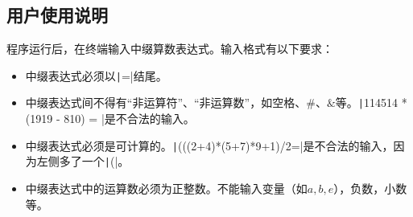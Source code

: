 \documentclass[10pt,a4paper]{article}
\begin{document}
	\subsection{用户使用说明}
	\noindent 程序运行后，在终端输入中缀算数表达式。输入格式有以下要求：
	\begin{itemize}
		\item 中缀表达式必须以\texttt|=|结尾。
		\item 中缀表达式间不得有“非运算符”、“非运算数”，如空格、$\#$、$\&$等。\texttt|114514 * (1919 - 810) = |是不合法的输入。
		\item 中缀表达式必须是可计算的。\texttt|(((2+4)*(5+7)*9+1)/2=|是不合法的输入，因为左侧多了一个\texttt|(|。
		\item 中缀表达式中的运算数必须为正整数。不能输入变量（如$a,b,e$），负数，小数等。
	\end{itemize}
\end{document}
